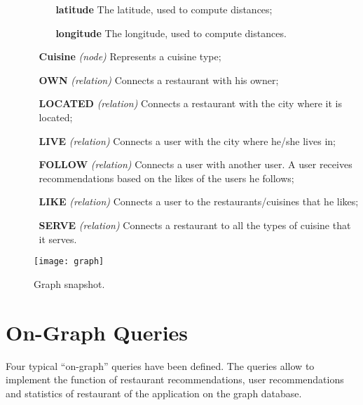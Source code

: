 \begin{itemize}
\begin{itemize}
\begin{itemize}
            \item[\textbf{latitude}] The latitude, used to compute distances;
            \item[\textbf{longitude}] The longitude, used to compute distances.
        \end{itemize}
    \item[\textbf{Cuisine}] \textit{(node)} Represents a cuisine type;
    \item[\textbf{OWN}] \textit{(relation)} Connects a restaurant with his
	    owner;
    \item[\textbf{LOCATED}] \textit{(relation)} Connects a restaurant with the
        city where it is located;
    \item[\textbf{LIVE}] \textit{(relation)} Connects a user with the city where
        he/she lives in;
    \item[\textbf{FOLLOW}] \textit{(relation)} Connects a user with another
	    user.  A user receives recommendations based on the likes of the
	    users he follows;
    \item[\textbf{LIKE}] \textit{(relation)} Connects a user to the
	    restaurants/cuisines that he likes;
    \item[\textbf{SERVE}] \textit{(relation)} Connects a restaurant to all the types
        of cuisine that it serves.
        \end{itemize}
\end{itemize}

\begin{figure}[htb]
    \centering
	\texttt{[image: graph]}
	\caption{Graph snapshot.}\label{fig:graph}
\end{figure}

\section{On-Graph Queries}

Four typical ``on-graph'' queries have been defined. The queries allow to
implement the function of restaurant recommendations, user recommendations and
statistics of restaurant of the application on the graph database.


